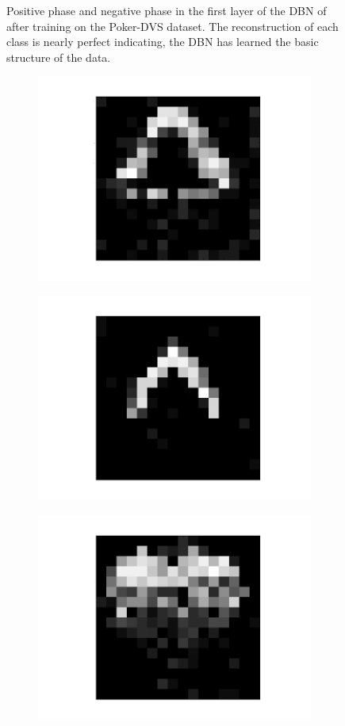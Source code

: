 \begin{figure}[h!]
\begin{subfigure}{.25\textwidth}
  		\label{fig:sub1}
	\end{subfigure}%
	\caption[Positive phase and negative phase in the first layer of the DBN of after training on the Poker-DVS dataset.]{Positive phase and negative phase in the first layer of the DBN of after training on the Poker-DVS dataset. The reconstruction of each class is nearly perfect indicating, the DBN has learned the basic structure of the data.}
	\label{fig:pokerrecon}
\end{figure}



\begin{figure}[h!]
	\centering
	\begin{subfigure}{.25\textwidth}
  		\centering
  		\includegraphics[width=.6\linewidth]{imgs/poker/compl11.png}
  		\label{fig:sub1}
	\end{subfigure}%
	\begin{subfigure}{.25\textwidth}
  		\centering
  		\includegraphics[width=.6\linewidth]{imgs/poker/compl21.png}
  		\label{fig:sub1}
	\end{subfigure}%
	\begin{subfigure}{.25\textwidth}
  		\centering
  		\includegraphics[width=.6\linewidth]{imgs/poker/compl31.png}

\end{subfigure}
\end{figure}
